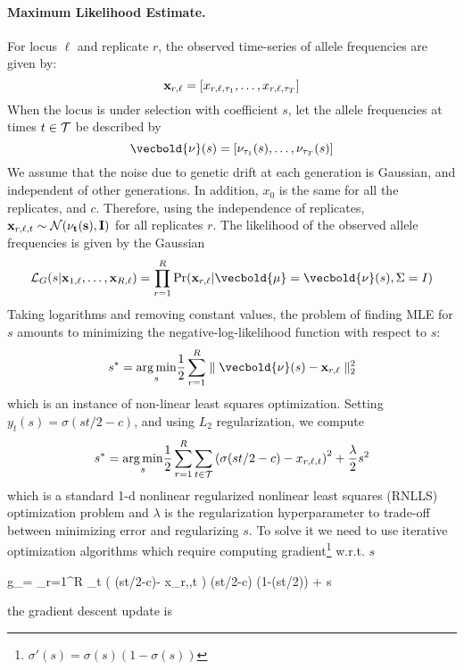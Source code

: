 \paragraph{Maximum Likelihood Estimate.}
For locus $\ell$  and replicate $r$, the observed time-series of 
allele frequencies are given by:
\[
{{\mathbf x}_{r,\ell}} = [x_{r,\ell,\tau_1},\ldots,x_{r,\ell,\tau_T}]
\]
When the locus is under selection with coefficient $s$, let the allele
frequencies at times $t\in {\cal T}$ be described by
\[
\vecbold{\nu}(s) = [\nu_{\tau_1}(s),\ldots,\nu_{\tau_T}(s)]
\]
We assume that the noise due to genetic drift at each generation is
Gaussian, and independent of other generations. In addition, $x_0$ is
the same for all the replicates, and $c$. Therefore, using the
independence of replicates, ${\mathbf x}_{r,\ell,t} \sim {\cal N}(\bf\nu_t(s),I)$
for all replicates $r$. The likelihood of the observed allele
frequencies is given by the Gaussian
\begin{equation}
  \Lc_G(s|\bfx_{1,\ell}, \dots,\bfx_{R,\ell}) = \prod_{r=1}^R \Pr(\bfx_{r,\ell}| \vecbold{\mu}=\vecbold{\nu}(s),
\Sigma= I) 
\end{equation}
Taking logarithms and removing constant values, the problem of finding
MLE for $s$ amounts to minimizing the negative-log-likelihood function
with respect to $s$: 
\begin{equation}
  s^*=\underset{s}{\arg \min} \frac{1}{2} \sum_{r=1}^R \parallel {\vecbold{\nu}(s) -
  \bfx_{r,\ell}} \parallel_2^2
  \label{eq:nlls0}
\end{equation}
which is an instance of non-linear least squares optimization.
Setting $y_t(s)=\sigma(st/2-c)$, and using $L_2$ regularization, we
compute
\begin{equation}
  s^*=\underset{s}{\arg \min} \frac{1}{2}  \sum_{r=1}^R\sum_{t\in {\cal T}} \left( \sigma(st/2-c)- x_{r,\ell,t} \right)^2 + \frac{\lambda }{2}s^2
\end{equation}
which is a standard 1-d nonlinear regularized nonlinear least squares
(RNLLS) optimization problem and $\lambda$ is the regularization hyperparameter to trade-off between minimizing error and regularizing $s$. To solve it we need to use iterative
optimization algorithms which require computing
gradient\footnote{$\sigma'(s)=\sigma(s)(1-\sigma(s))$} w.r.t. $s$

\beq \label{eq:grad}
g_\ell=   \sum_{r=1}^R \sum_{t\in \Tc}  ( \sigma(st/2-c)- x_{r,\ell,t} ) \sigma(st/2-c) (1-\sigma(st/2)) + \lambda s
\eeq

the gradient descent update is

